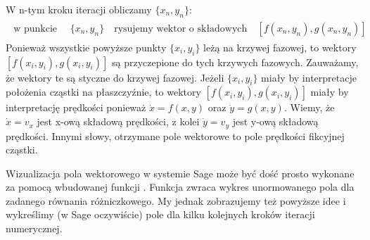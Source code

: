 \documentclass[a4paper,12pt,polish]{sphinxmanual}
\begin{document}
W n-tym kroku iteracji obliczamy  $\{x_n, y_n\}$:
\label{ch1/chI021:equation-eqn67}\begin{gather}
\begin{split}\mbox{w punkcie }  \quad \{x_n, y_n\}   \quad \mbox{rysujemy wektor o składowych} \quad [f(x_n, y_n), g(x_n, y_n)]\end{split}\label{ch1/chI021-eqn67}
\end{gather}
Ponieważ wszystkie powyższe punkty  $\{x_i, y_i\}$ leżą na krzywej fazowej, to wektory $[f(x_i, y_i), g(x_i, y_i)]$  są przyczepione do tych krzywych fazowych. Zauważamy, że wektory te są styczne do krzywej fazowej. Jeżeli $\{x_i, y_i\}$ miały by interpretacje położenia cząstki na płaszczyźnie, to wektory  $[f(x_i, y_i), g(x_i, y_i)]$ miały by interpretację prędkości ponieważ $\dot x = f(x, y)$ oraz $\dot y = g(x, y)$. Wiemy, że $\dot x = v_x$ jest x-ową składową prędkości, z kolei $\dot y = v_y$ jest y-ową składową prędkości. Innymi słowy, otrzymane pole wektorowe to pole prędkości fikcyjnej cząstki.

Wizualizacja pola wektorowego w systemie Sage może być dość prosto wykonane za pomocą wbudowanej funkcji
. Funkcja zwraca wykres unormowanego pola dla zadanego równania różniczkowego. My
jednak zobrazujemy też powyższe idee i wykreślimy (w Sage oczywiście) pole dla kilku kolejnych kroków iteracji
numerycznej.
\end{document}
